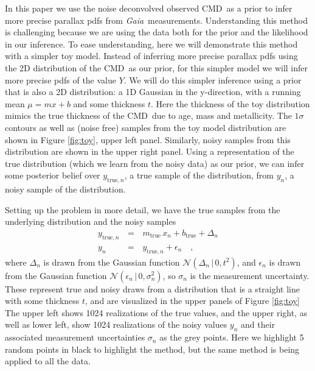\documentclass[modern]{aastex61}
\newcommand{\acronym}[1]{{\small{#1}}}
\newcommand{\project}[1]{\textsl{#1}}
\newcommand{\gaia}{\project{Gaia}}
\newcommand{\cmd}{\acronym{CMD}}
\newcommand{\given}{\,|\,}
\newcommand{\true}{\mathrm{true}}
\begin{document}
In this paper we use the noise deconvolved observed \cmd\ as a prior to infer more precise parallax pdfs from \gaia\ measurements.
Understanding this method is challenging because we are using the data both for the prior and the likelihood in our inference.
To ease understanding, here we will demonstrate this method with a simpler toy model.
Instead of inferring more precise parallax pdfs using the 2D distribution of the \cmd\ as our prior, for this simpler model we will infer more precise pdfs of the value $Y$.
We will do this simpler inference using a prior that is also a 2D distribution: a 1D Gaussian in the y-direction, with a running mean $\mu = mx + b$ and some thickness $t$.
Here the thickness of the toy distribution mimics the true thickness of the \cmd\ due to age, mass and metallicity.
The $1\sigma$ contours as well as (noise free) samples from the toy model distribution are shown in Figure \ref{fig:toy}, upper left panel.
Similarly, noisy samples from this distribution are shown in the upper right panel.
Using a representation of the true distribution (which we learn from the noisy data) as our prior, we can infer some posterior belief over $y_{\true,n}$, a true sample of the distribution, from $y_n$, a noisy sample of the distribution.

Setting up the problem in more detail, we have the true samples from the underlying distribution and the noisy samples
\begin{eqnarray}
y_{\true, n} \, &=& \, m_{\true}\,x_n + b_{\true} + \Delta_n \\
y_n \, &=& \, y_{\true,n} + \epsilon_n \quad,
\label{eq:ytrue}
\end{eqnarray}
where $\Delta_n$ is drawn from the Gaussian function $\mathcal{N}(\Delta_n \given 0, t^2)$, and $\epsilon_n$ is drawn from the Gaussian function $\mathcal{N}(\epsilon_n \given 0, \sigma_n^2)$, so $\sigma_n$ is the measurement uncertainty.
These represent true and noisy draws from a distribution that is a straight line with some thickness $t$, and are visualized in the upper panels of Figure \ref{fig:toy}
The upper left shows 1024 realizations of the true values, and the upper right, as well as lower left, show 1024 realizations of the noisy values $y_n$ and their associated measurement uncertainties $\sigma_n$ as the grey points. Here we highlight 5 random points in black to highlight the method, but the same method is being applied to all the data.
\end{document}
